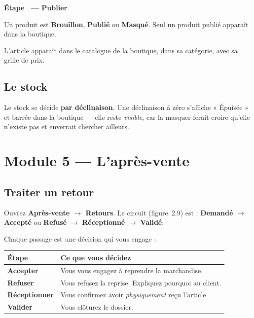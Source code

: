 \documentclass[11pt,a4paper]{report}
\newcounter{etape}[section]
\newcommand{\etape}[1]{%
  \stepcounter{etape}%
  \vspace{9pt}%
  \noindent{\color{garahPrimaire}\rule{3pt}{13pt}}\hspace{6pt}%
  {\bfseries\large Étape \theetape\ --- #1}\par\vspace{4pt}%
}
\begin{document}
\etape{Publier}

Un produit est \textbf{Brouillon}, \textbf{Publié} ou \textbf{Masqué}. Seul un
produit publié apparaît dans la boutique.

\begin{resultat}
L'article apparaît dans le catalogue de la boutique, dans sa catégorie, avec sa
grille de prix.
\end{resultat}

\subsection{Le stock}

\begin{attention}
Le stock se décide \textbf{par déclinaison}. Une déclinaison à zéro s'affiche
« Épuisée » et barrée dans la boutique — elle reste \emph{visible}, car la
masquer ferait croire qu'elle n'existe pas et enverrait chercher ailleurs.
\end{attention}

\section{Module 5 — L'après-vente}

\subsection{Traiter un retour}

Ouvrez \textbf{Après-vente $\rightarrow$ Retours}. Le circuit
(figure~2.9) est :
\textbf{Demandé} $\rightarrow$ \textbf{Accepté} ou \textbf{Refusé}
$\rightarrow$ \textbf{Réceptionné} $\rightarrow$ \textbf{Validé}.

Chaque passage est une décision qui vous engage :

\begin{center}
\begin{tabular}{@{}>{\bfseries}p{3.4cm} p{11.4cm}@{}}
\toprule
Étape & Ce que vous décidez \\
\midrule
Accepter & Vous vous engagez à reprendre la marchandise. \\
Refuser & Vous refusez la reprise. Expliquez pourquoi au client. \\
Réceptionner & Vous confirmez avoir \emph{physiquement} reçu l'article. \\
Valider & Vous clôturez le dossier. \\
\bottomrule
\end{tabular}
\end{center}
\end{document}
